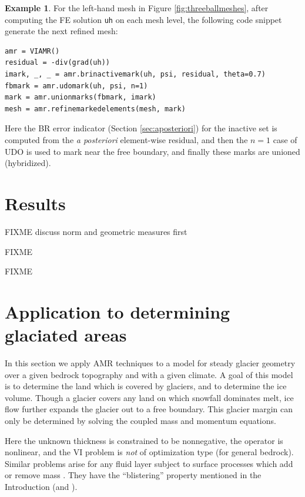 \documentclass[]{interact}
\theoremstyle{plain}%
\theoremstyle{definition}
\newtheorem{example}[theorem]{Example}
\theoremstyle{remark}
\begin{document}
\begin{example} \label{example:hybrid}
For the left-hand mesh in Figure \ref{fig:threeballmeshes}, after computing the FE solution \texttt{uh} on each mesh level, the following code snippet generate the next refined mesh:
\begin{verbatim}
amr = VIAMR()
residual = -div(grad(uh))
imark, _, _ = amr.brinactivemark(uh, psi, residual, theta=0.7)
fbmark = amr.udomark(uh, psi, n=1)
mark = amr.unionmarks(fbmark, imark)
mesh = amr.refinemarkedelements(mesh, mark)
\end{verbatim}
Here the BR error indicator (Section \ref{sec:aposteriori}) for the inactive set is computed from the \emph{a posteriori} element-wise residual, and then the $n=1$ case of UDO is used to mark near the free boundary, and finally these marks are unioned (hybridized).
\end{example}



\section{Results} \label{sec:results}

FIXME discuss norm and geometric measures first

FIXME \cite{Kosub2016} \cite{JungeblutKleistMiltzow2022}

FIXME


\section{Application to determining glaciated areas} \label{sec:app}

In this section we apply AMR techniques to a model for steady glacier geometry over a given bedrock topography and with a given climate.  A goal of this model is to determine the land which is covered by glaciers, and to determine the ice volume.  Though a glacier covers any land on which snowfall dominates melt, ice flow further expands the glacier out to a free boundary.  This glacier margin can only be determined by solving the coupled mass and momentum equations.

Here the unknown thickness is constrained to be nonnegative, the operator is nonlinear, and the VI problem is \emph{not} of optimization type (for general bedrock).  Similar problems arise for any fluid layer subject to surface processes which add or remove mass \cite{Bueler2021b}.  They have the ``blistering'' property mentioned in the Introduction (and \cite{JouvetBueler2012}).
\end{document}
